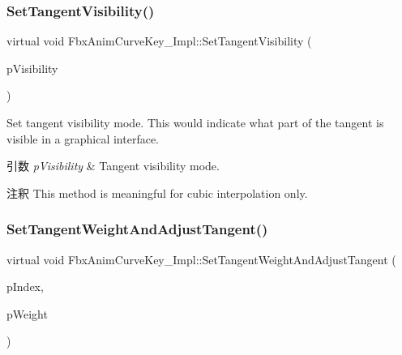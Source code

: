 \subsubsection{\texorpdfstring{Set\+Tangent\+Visibility()}{SetTangentVisibility()}}
{\footnotesize\ttfamily virtual void Fbx\+Anim\+Curve\+Key\+\_\+\+Impl\+::\+Set\+Tangent\+Visibility (\begin{DoxyParamCaption}\item[{\hyperlink{class_fbx_anim_curve_def_a70c49072776ac6b3426c57dd80e16e3b}{Fbx\+Anim\+Curve\+Def\+::\+E\+Tangent\+Visibility}}]{p\+Visibility }\end{DoxyParamCaption})\hspace{0.3cm}{\ttfamily [pure virtual]}}

Set tangent visibility mode. This would indicate what part of the tangent is visible in a graphical interface. 
\begin{DoxyParams}{引数}
{\em p\+Visibility} & Tangent visibility mode. \\
\hline
\end{DoxyParams}
\begin{DoxyRemark}{注釈}
This method is meaningful for cubic interpolation only. 
\end{DoxyRemark}
\mbox{\label{class_fbx_anim_curve_key___impl_a2740276be28a5fb7466c0d9137c50fbb}} 
\subsubsection{\texorpdfstring{Set\+Tangent\+Weight\+And\+Adjust\+Tangent()}{SetTangentWeightAndAdjustTangent()}}
{\footnotesize\ttfamily virtual void Fbx\+Anim\+Curve\+Key\+\_\+\+Impl\+::\+Set\+Tangent\+Weight\+And\+Adjust\+Tangent (\begin{DoxyParamCaption}\item[{\hyperlink{class_fbx_anim_curve_def_a3be261d961f8226235529b148cf80300}{Fbx\+Anim\+Curve\+Def\+::\+E\+Data\+Index}}]{p\+Index,  }\item[{double}]{p\+Weight }\end{DoxyParamCaption})\hspace{0.3cm}{\ttfamily [pure virtual]}}

